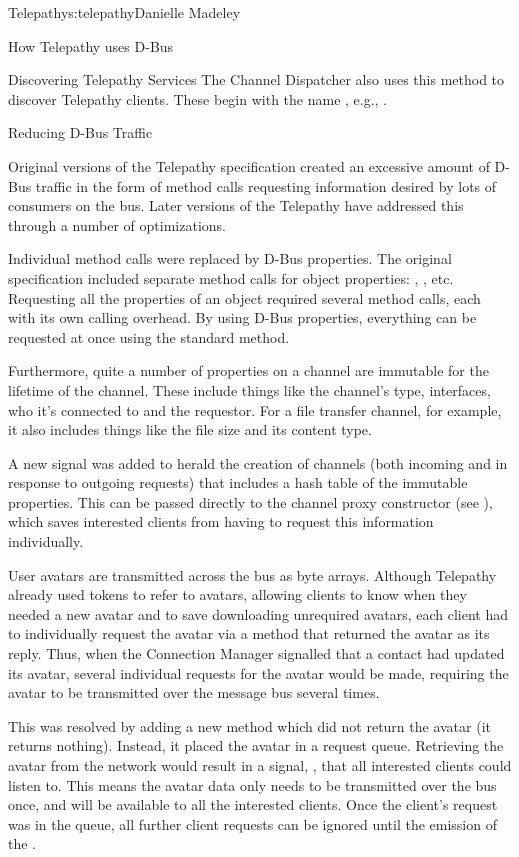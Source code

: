 \begin{aosachapter}{Telepathy}{s:telepathy}{Danielle Madeley}
\begin{aosasect1}{How Telepathy uses D-Bus}
\begin{aosasect2}{Discovering Telepathy Services}
The Channel Dispatcher also uses this method to discover Telepathy
clients. These begin with the name , e.g.,
.

\end{aosasect2}

\begin{aosasect2}{Reducing D-Bus Traffic}

Original versions of the Telepathy specification created an excessive
amount of D-Bus traffic in the form of method calls requesting
information desired by lots of consumers on the bus. Later versions of
the Telepathy have addressed this through a number of optimizations.

Individual method calls were replaced by D-Bus properties. The
original specification included separate method calls for object
properties: , ,
etc. Requesting all the properties of an object required several
method calls, each with its own calling overhead. By using D-Bus
properties, everything can be requested at once using the standard
 method.

Furthermore, quite a number of properties on a channel are immutable
for the lifetime of the channel. These include things like the
channel's type, interfaces, who it's connected to and the requestor.
For a file transfer channel, for example, it also includes things like
the file size and its content type.

A new signal was added to herald the creation of channels (both
incoming and in response to outgoing requests) that includes a hash
table of the immutable properties.  This can be passed directly to the
channel proxy constructor (see ),
which saves interested clients from having to request this information
individually.

User avatars are transmitted across the bus as byte arrays. Although
Telepathy already used tokens to refer to avatars, allowing clients to
know when they needed a new avatar and to save downloading unrequired
avatars, each client had to individually request the avatar via a
 method that returned the avatar as its reply.
Thus, when the Connection Manager signalled that a contact had updated
its avatar, several individual requests for the avatar would be made,
requiring the avatar to be transmitted over the message bus several
times.

This was resolved by adding a new method which did not return the
avatar (it returns nothing). Instead, it placed the avatar in a
request queue.  Retrieving the avatar from the network would result in
a signal, , that all interested clients could
listen to. This means the avatar data only needs to be transmitted
over the bus once, and will be available to all the interested
clients. Once the client's request was in the queue, all further
client requests can be ignored until the emission of the
.


\end{aosasect2}
\end{aosasect1}
\end{aosachapter}
